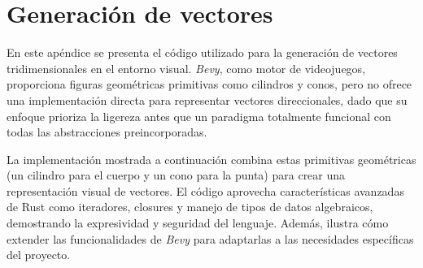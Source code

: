 \newpage
\section{Generación de vectores} \label{apx:spawn_ref_vec}

En este apéndice se presenta el código utilizado para la generación de vectores tridimensionales en el entorno visual. \textit{Bevy}, como motor de videojuegos, proporciona figuras geométricas primitivas como cilindros y conos, pero no ofrece una implementación directa para representar vectores direccionales, dado que su enfoque prioriza la ligereza antes que un paradigma totalmente funcional con todas las abstracciones preincorporadas.

La implementación mostrada a continuación combina estas primitivas geométricas (un cilindro para el cuerpo y un cono para la punta) para crear una representación visual de vectores. El código aprovecha características avanzadas de Rust como iteradores, closures y manejo de tipos de datos algebraicos, demostrando la expresividad y seguridad del lenguaje. Además, ilustra cómo extender las funcionalidades de \textit{Bevy} para adaptarlas a las necesidades específicas del proyecto.

